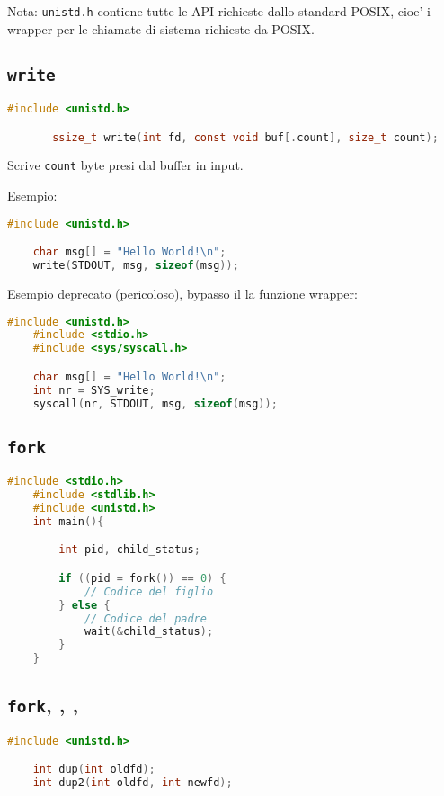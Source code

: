 Nota: \texttt{unistd.h} contiene tutte le API richieste dallo standard POSIX,
cioe' i wrapper per le chiamate di sistema richieste da POSIX.

\subsection{\texttt{write}}
\begin{lstlisting}[language=c]
    #include <unistd.h>

       ssize_t write(int fd, const void buf[.count], size_t count);
\end{lstlisting}

Scrive \texttt{count} byte presi dal buffer in input.

Esempio:
\begin{lstlisting}[language=c]
    #include <unistd.h>

    char msg[] = "Hello World!\n";
    write(STDOUT, msg, sizeof(msg));
\end{lstlisting}

Esempio deprecato (pericoloso), bypasso il la funzione wrapper:
\begin{lstlisting}[language=c]
    #include <unistd.h>
    #include <stdio.h>
    #include <sys/syscall.h>

    char msg[] = "Hello World!\n";
	int nr = SYS_write;
	syscall(nr, STDOUT, msg, sizeof(msg));
\end{lstlisting}

\subsection{\texttt{fork}}
\begin{lstlisting}[language=c]
    #include <stdio.h> 
    #include <stdlib.h>
    #include <unistd.h> 
    int main(){

        int pid, child_status;

        if ((pid = fork()) == 0) {
            // Codice del figlio
        } else { 
            // Codice del padre
            wait(&child_status);
        }
    }
\end{lstlisting}

\subsection{\texttt{fork}, , , }

\begin{lstlisting}[language=c]
    #include <unistd.h>

    int dup(int oldfd);
    int dup2(int oldfd, int newfd);
\end{lstlisting}

